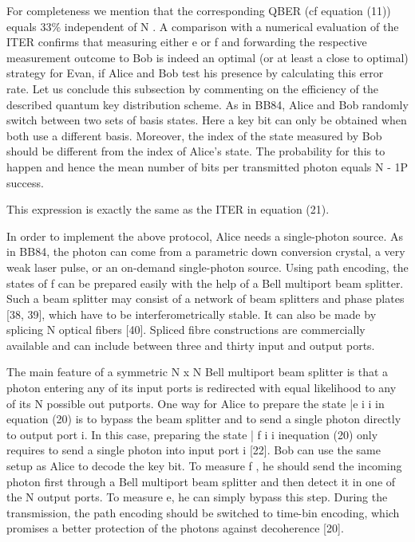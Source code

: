 For completeness we mention that the corresponding QBER (cf equation (11)) equals 33\% independent of N . A comparison with a numerical evaluation of the ITER confirms that measuring either e or f and forwarding the respective measurement outcome to Bob is indeed an optimal (or at least a close to optimal) strategy for Evan, if Alice and Bob test his presence by calculating this error rate.
Let us conclude this subsection by commenting on the efficiency of the described quantum key distribution scheme. As in BB84, Alice and Bob randomly switch between two sets of basis states. Here a key bit can only be obtained when both use a different basis. Moreover, the index of the state measured by Bob should be different from the index of Alice’s state. The probability for this to happen and hence the mean number of bits per transmitted photon equals N - 1P success.

This expression is exactly the same as the ITER in equation (21).

In order to implement the above protocol, Alice needs a single-photon source. As in BB84, the photon can come from a parametric down conversion crystal, a very weak laser pulse, or an on-demand single-photon source. Using path encoding, the states of f can be prepared easily with the help of a Bell multiport beam splitter. Such a beam splitter may consist of a network of beam splitters and phase plates [38, 39], which have to be interferometrically stable. It can also be made by splicing N optical fibers [40]. Spliced fibre constructions are commercially available and can include between three and thirty input and output ports.

The main feature of a symmetric N x N Bell multiport beam splitter is that a photon entering any of its input ports is redirected with equal likelihood to any of its N possible out putports. One way for Alice to prepare the state |e i i in equation (20) is to bypass the beam splitter and to send a single photon directly to output port i. In this case, preparing the state | f i i inequation (20) only requires to send a single photon into input port i [22]. Bob can use the same setup as Alice to decode the key bit. To measure f , he should send the incoming photon first through a Bell multiport beam splitter and then detect it in one of the N output ports. To measure e, he can simply bypass this step. During the transmission, the path encoding should be switched to time-bin encoding, which promises a better protection of the photons against decoherence [20].

